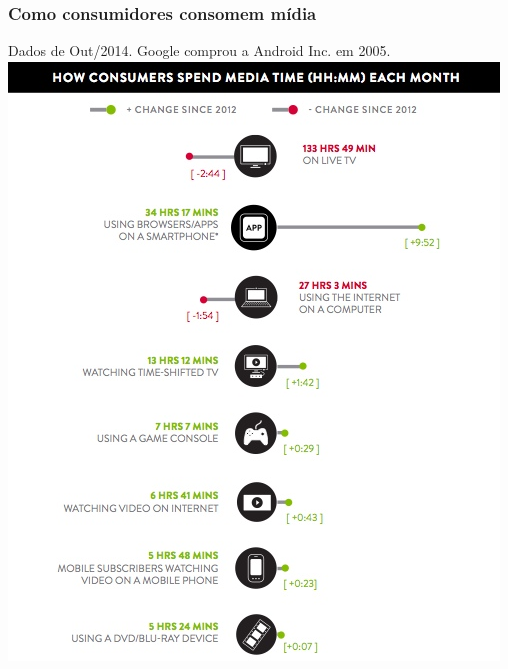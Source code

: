 \documentclass[xcolor=dvipsnames]{beamer}
\begin{document}
\begin{frame}
	\frametitle{Como consumidores consomem mídia}
	Dados de Out/2014. Google comprou a Android Inc. em 2005.
	\vspace{0.2cm}
 	\includegraphics[scale=0.50]{time_spent.jpg}
\end{frame}
\end{document}
